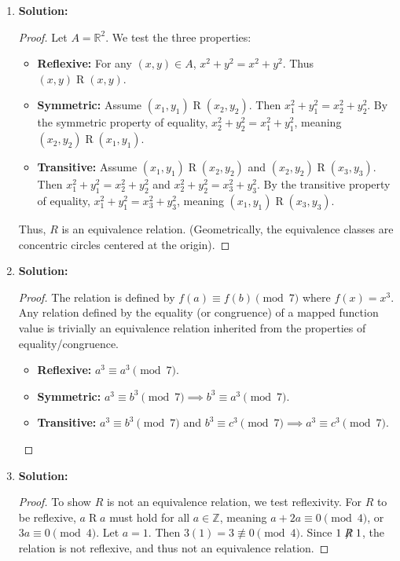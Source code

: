 \documentclass[11pt, a4paper]{article}
\theoremstyle{definition}
\theoremstyle{remark}
\newcommand{\R}{\mathbb{R}}
\newcommand{\Z}{\mathbb{Z}}
\begin{document}
\begin{enumerate}[label=\textbf{\arabic*.}]
    \item \textbf{Solution:}
    \begin{proof}
    Let $A = \R^2$. We test the three properties:
    \begin{itemize}
        \item \textbf{Reflexive:} For any $(x,y) \in A$, $x^2 + y^2 = x^2 + y^2$. Thus $(x,y) \mathrel{R} (x,y)$.
        \item \textbf{Symmetric:} Assume $(x_1, y_1) \mathrel{R} (x_2, y_2)$. Then $x_1^2 + y_1^2 = x_2^2 + y_2^2$. By the symmetric property of equality, $x_2^2 + y_2^2 = x_1^2 + y_1^2$, meaning $(x_2, y_2) \mathrel{R} (x_1, y_1)$.
        \item \textbf{Transitive:} Assume $(x_1, y_1) \mathrel{R} (x_2, y_2)$ and $(x_2, y_2) \mathrel{R} (x_3, y_3)$. Then $x_1^2 + y_1^2 = x_2^2 + y_2^2$ and $x_2^2 + y_2^2 = x_3^2 + y_3^2$. By the transitive property of equality, $x_1^2 + y_1^2 = x_3^2 + y_3^2$, meaning $(x_1, y_1) \mathrel{R} (x_3, y_3)$.
    \end{itemize}
    Thus, $R$ is an equivalence relation. (Geometrically, the equivalence classes are concentric circles centered at the origin).
    \end{proof}

    \item \textbf{Solution:}
    \begin{proof}
    The relation is defined by $f(a) \equiv f(b) \pmod{7}$ where $f(x) = x^3$. Any relation defined by the equality (or congruence) of a mapped function value is trivially an equivalence relation inherited from the properties of equality/congruence.
    \begin{itemize}
        \item \textbf{Reflexive:} $a^3 \equiv a^3 \pmod{7}$.
        \item \textbf{Symmetric:} $a^3 \equiv b^3 \pmod{7} \implies b^3 \equiv a^3 \pmod{7}$.
        \item \textbf{Transitive:} $a^3 \equiv b^3 \pmod{7}$ and $b^3 \equiv c^3 \pmod{7} \implies a^3 \equiv c^3 \pmod{7}$.
    \end{itemize}
    \end{proof}

    \item \textbf{Solution:}
    \begin{proof}
    To show $R$ is not an equivalence relation, we test reflexivity. For $R$ to be reflexive, $a \mathrel{R} a$ must hold for all $a \in \Z$, meaning $a + 2a \equiv 0 \pmod{4}$, or $3a \equiv 0 \pmod{4}$. Let $a = 1$. Then $3(1) = 3 \not\equiv 0 \pmod{4}$. Since $1 \not\mathrel{R} 1$, the relation is not reflexive, and thus not an equivalence relation.
    \end{proof}


\end{enumerate}
\end{document}
